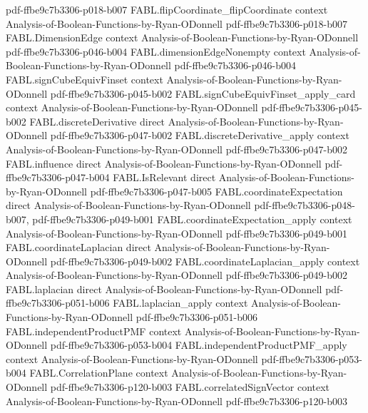 \begin{theorem}
  {pdf-ffbe9c7b3306-p018-b007}
\proofstep
  {FABL.flipCoordinate_flipCoordinate}
  {context}
  {Analysis-of-Boolean-Functions-by-Ryan-ODonnell}
  {pdf-ffbe9c7b3306-p018-b007}
\proofstep
  {FABL.DimensionEdge}
  {context}
  {Analysis-of-Boolean-Functions-by-Ryan-ODonnell}
  {pdf-ffbe9c7b3306-p046-b004}
\proofstep
  {FABL.dimensionEdgeNonempty}
  {context}
  {Analysis-of-Boolean-Functions-by-Ryan-ODonnell}
  {pdf-ffbe9c7b3306-p046-b004}
\proofstep
  {FABL.signCubeEquivFinset}
  {context}
  {Analysis-of-Boolean-Functions-by-Ryan-ODonnell}
  {pdf-ffbe9c7b3306-p045-b002}
\proofstep
  {FABL.signCubeEquivFinset_apply_card}
  {context}
  {Analysis-of-Boolean-Functions-by-Ryan-ODonnell}
  {pdf-ffbe9c7b3306-p045-b002}
\proofstep
  {FABL.discreteDerivative}
  {direct}
  {Analysis-of-Boolean-Functions-by-Ryan-ODonnell}
  {pdf-ffbe9c7b3306-p047-b002}
\proofstep
  {FABL.discreteDerivative_apply}
  {context}
  {Analysis-of-Boolean-Functions-by-Ryan-ODonnell}
  {pdf-ffbe9c7b3306-p047-b002}
\proofstep
  {FABL.influence}
  {direct}
  {Analysis-of-Boolean-Functions-by-Ryan-ODonnell}
  {pdf-ffbe9c7b3306-p047-b004}
\proofstep
  {FABL.IsRelevant}
  {direct}
  {Analysis-of-Boolean-Functions-by-Ryan-ODonnell}
  {pdf-ffbe9c7b3306-p047-b005}
\proofstep
  {FABL.coordinateExpectation}
  {direct}
  {Analysis-of-Boolean-Functions-by-Ryan-ODonnell}
  {pdf-ffbe9c7b3306-p048-b007,
    pdf-ffbe9c7b3306-p049-b001}
\proofstep
  {FABL.coordinateExpectation_apply}
  {context}
  {Analysis-of-Boolean-Functions-by-Ryan-ODonnell}
  {pdf-ffbe9c7b3306-p049-b001}
\proofstep
  {FABL.coordinateLaplacian}
  {direct}
  {Analysis-of-Boolean-Functions-by-Ryan-ODonnell}
  {pdf-ffbe9c7b3306-p049-b002}
\proofstep
  {FABL.coordinateLaplacian_apply}
  {context}
  {Analysis-of-Boolean-Functions-by-Ryan-ODonnell}
  {pdf-ffbe9c7b3306-p049-b002}
\proofstep
  {FABL.laplacian}
  {direct}
  {Analysis-of-Boolean-Functions-by-Ryan-ODonnell}
  {pdf-ffbe9c7b3306-p051-b006}
\proofstep
  {FABL.laplacian_apply}
  {context}
  {Analysis-of-Boolean-Functions-by-Ryan-ODonnell}
  {pdf-ffbe9c7b3306-p051-b006}
\proofstep
  {FABL.independentProductPMF}
  {context}
  {Analysis-of-Boolean-Functions-by-Ryan-ODonnell}
  {pdf-ffbe9c7b3306-p053-b004}
\proofstep
  {FABL.independentProductPMF_apply}
  {context}
  {Analysis-of-Boolean-Functions-by-Ryan-ODonnell}
  {pdf-ffbe9c7b3306-p053-b004}
\proofstep
  {FABL.CorrelationPlane}
  {context}
  {Analysis-of-Boolean-Functions-by-Ryan-ODonnell}
  {pdf-ffbe9c7b3306-p120-b003}
\proofstep
  {FABL.correlatedSignVector}
  {context}
  {Analysis-of-Boolean-Functions-by-Ryan-ODonnell}
  {pdf-ffbe9c7b3306-p120-b003}

\end{theorem}
